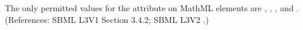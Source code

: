 The only permitted values for the attribute  on MathML
 elements are , , , and
.  (References: SBML L3V1 Section 3.4.2; SBML L3V2 .)
